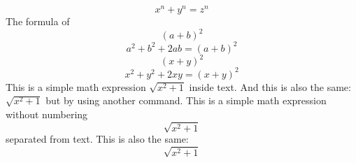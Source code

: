 \documentclass{article}
\begin{document}
\[ x^n + y^n = z^n \]
The formula of
\[(a+b)^2\]
\begin{equation}
a^2+b^2+2ab=(a+b)^2
\end{equation}
\[(x+y)^2\]
\begin{equation}
x^2+y^2+2xy=(x+y)^2
\end{equation}
This is a simple math expression \(\sqrt{x^2+1}\) inside text.
And this is also the same:
\begin{math}
\sqrt{x^2+1}
\end{math}
but by using another command.
This is a simple math expression without numbering
\[\sqrt{x^2+1}\]
separated from text.
This is also the same:
\begin{displaymath}
\sqrt{x^2+1}
\end{displaymath}
\end{document}
